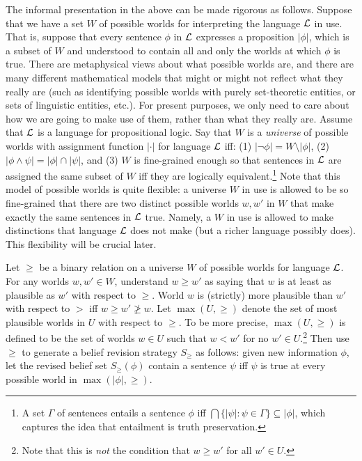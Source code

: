 The informal presentation in the above can be made rigorous as follows. Suppose that we have a set $W$ of possible worlds for interpreting the language $\cal L$ in use. That is, suppose that every sentence $\phi$ in ${\cal L}$ expresses a proposition $|\phi|$, which is a subset of $W$ and understood to contain all and only the worlds at which $\phi$ is true.  There are metaphysical views about what possible worlds are, and there are many different mathematical models that might or might not reflect what they really are (such as identifying possible worlds with purely set-theoretic entities, or sets of linguistic entities, etc.). For present purposes, we only need to care about how we are going to make use of them, rather than what they really are. Assume that ${\cal L}$ is a language for propositional logic. Say that $W$ is a {\em universe} of possible worlds with assignment function $|\cdot|$ for language ${\cal L}$ iff: (1) $|\neg\phi| = W \setminus |\phi|$, (2) $|\phi\wedge\psi| = |\phi|\cap|\psi|$, and (3) $W$ is fine-grained enough so that sentences in $\cal L$ are assigned the same subset of $W$ iff they are logically equivalent.\footnote
	{A set $\Gamma$ of sentences entails a sentence $\phi$ iff $\bigcap \{ |\psi|: \psi \in \Gamma\} \subseteq |\phi|$, which captures the idea that entailment is truth preservation.} 
Note that this model of possible worlds is quite flexible: a universe $W$ in use is allowed to be so fine-grained that there are two distinct possible worlds $w, w'$ in $W$ that make exactly the same sentences in $\cal L$ true. Namely, a $W$ in use is allowed to make distinctions that language $\cal L$ does not make (but a richer language possibly does). This flexibility will be crucial later. 


Let $\ge$ be a binary relation on a universe $W$ of possible worlds for language ${\cal L}$. For any worlds $w, w' \in W$, understand $w \ge w'$ as saying that $w$ is at least as plausible as $w'$ with respect to $\ge$. World $w$ is (strictly) more plausible than $w'$ with respect to $>$ iff $w \ge w' \not\geq w$. Let $\max(U, \ge)$ denote the set of most plausible worlds in $U$ with respect to $\ge$. To be more precise, $\max(U, \ge)$ is defined to be the set of worlds $w \in U$ such that $w < w'$ for no $w' \in U$.\footnote
	{
	Note that this is {\em not} the condition that $w \geq w'$ for all $w' \in U$.
	} 
Then use $\ge$ to generate a belief revision strategy $S_{\ge}$ as follows: given new information $\phi$, let the revised belief set $S_{\ge}(\phi)$ contain a sentence $\psi$ iff $\psi$ is true at every possible world in $\max(|\phi|, \ge)$. \op

